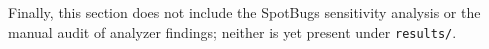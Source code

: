 Finally, this section does not include the SpotBugs sensitivity analysis or the manual audit of analyzer findings; neither is yet present under \texttt{results/}.


